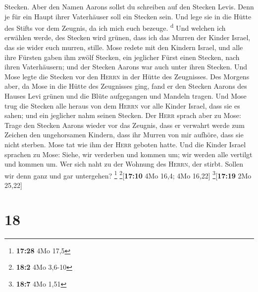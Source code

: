 Stecken.  Aber den Namen Aarons sollst du schreiben auf
den Stecken Levis. Denn je für ein Haupt ihrer Vaterhäuser soll ein
Stecken sein.  Und lege sie in die Hütte des Stifts vor
dem Zeugnis, da ich mich euch bezeuge. \textsuperscript{d}
 Und welchen ich erwählen werde, des Stecken wird grünen,
dass ich das Murren der Kinder Israel, das sie wider euch murren,
stille.  Mose redete mit den Kindern Israel, und alle
ihre Fürsten gaben ihm zwölf Stecken, ein jeglicher Fürst einen Stecken,
nach ihren Vaterhäusern; und der Stecken Aarons war auch unter ihren
Stecken.  Und Mose legte die Stecken vor den
\textsc{Herrn} in der Hütte des Zeugnisses.  Des Morgens
aber, da Mose in die Hütte des Zeugnisses ging, fand er den Stecken
Aarons des Hauses Levi grünen und die Blüte aufgegangen und Mandeln
tragen.  Und Mose trug die Stecken alle heraus von dem
\textsc{Herrn} vor alle Kinder Israel, dass sie es sahen; und ein
jeglicher nahm seinen Stecken.  Der \textsc{Herr} sprach
aber zu Mose: Trage den Stecken Aarons wieder vor das Zeugnis, dass er
verwahrt werde zum Zeichen den ungehorsamen Kindern, dass ihr Murren von
mir aufhöre, dass sie nicht sterben.  Mose tat wie ihm
der \textsc{Herr} geboten hatte.  Und die Kinder Israel
sprachen zu Mose: Siehe, wir verderben und kommen um; wir werden alle
vertilgt und kommen um.  Wer sich naht zu der Wohnung des
\textsc{Herrn}, der stirbt. Sollen wir denn ganz und gar untergehen?
\footnote{\textbf{17:28} 4Mo 17,5} \footnote{\textbf{18:2} 4Mo 3,6-10}{[}\textbf{17:10}
4Mo 16,4; 4Mo 16,22{]} \footnote{\textbf{18:7} 4Mo 1,51}{[}\textbf{17:19}
2Mo 25,22{]}

\hypertarget{section-17}{%
\section{18}\label{section-17}}

